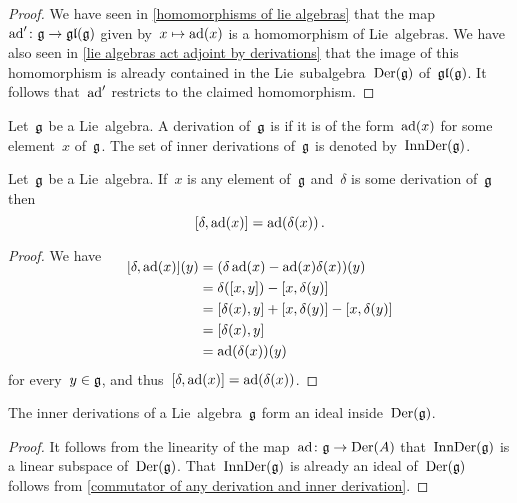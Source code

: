 \begin{proof}
  We have seen in \cref{homomorphisms of lie algebras} that the map~$\ad' \colon \glie \to \gllie(\glie)$ given by~$x \mapsto \ad(x)$ is a homomorphism of Lie~algebras.
  We have also seen in \cref{lie algebras act adjoint by derivations} that the image of this homomorphism is already contained in the Lie~subalgebra~$\operatorname{Der}(\mathfrak{g})$ of~$\mathfrak{gl}(\mathfrak{g})$.
  It follows that~$\operatorname{ad}'$ restricts to the claimed homomorphism.
\end{proof}


\begin{definition}
  \label{definition of inner derivations}
 Let~$\mathfrak{g}$ be a Lie~algebra.
 A derivation of~$\mathfrak{g}$ is  if it is of the form~$\operatorname{ad}(x)$ for some element~$x$ of~$\mathfrak{g}$.
 The set of inner derivations of~$\mathfrak{g}$ is denoted by~$\operatorname{InnDer}(\mathfrak{g})$.
\end{definition}


\begin{lemma}
  \label{commutator of any derivation and inner derivation}
  Let~$\mathfrak{g}$ be a Lie~algebra.
  If~$x$ is any element of~$\mathfrak{g}$ and~$\delta$ is some derivation of~$\mathfrak{g}$ then
  \[
    [\delta, \operatorname{ad}(x)] = \operatorname{ad}(\delta(x)) \,.
  \]
\end{lemma}


\begin{proof}
  We have
  \begin{align*}
    \SwapAboveDisplaySkip
    [\delta, \ad(x)](y)
    &= 
    (\delta \ad(x) - \ad(x) \delta(x))(y)
    \\
    &=
    \delta([x,y]) - [x,\delta(y)]
    \\
    &=
    [\delta(x),y] + [x,\delta(y)] - [x,\delta(y)]
    \\
    &=
    [\delta(x),y]
    \\
    &=
    \ad(\delta(x))(y)
  \end{align*}
  for every~$y \in \mathfrak{g}$, and thus~$[\delta, \operatorname{ad}(x)] = \operatorname{ad}(\delta(x))$.
\end{proof}


\begin{corollary}
  \label{inner derivations are an ideal}
  The inner derivations of a Lie~algebra~$\mathfrak{g}$ form an ideal inside~$\operatorname{Der}(\mathfrak{g})$.
\end{corollary}


\begin{proof}
  It follows from the linearity of the map~$\ad \colon \glie \to \Der(A)$ that~$\operatorname{InnDer}(\mathfrak{g})$ is a linear subspace of~$\operatorname{Der}(\mathfrak{g})$.
  That~$\operatorname{InnDer}(\mathfrak{g})$ is already an ideal of~$\operatorname{Der}(\mathfrak{g})$ follows from \cref{commutator of any derivation and inner derivation}.
\end{proof}


